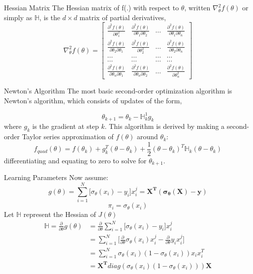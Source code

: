 \documentclass{beamer}
\begin{document}
\begin{frame}{Hessian Matrix}
The Hessian matrix of f(.) with respect to $\theta$, written $\nabla _{\theta}^{2}f(\theta)$ or simply as $\mathbb{H}$, is the $d \times d$ matrix of partial derivatives,
\begin{equation*}
\nabla _{\theta}^{2}f(\theta) = \begin{bmatrix} \frac{\partial^{2}f(\theta)}{\partial \theta_{1}^{2}} & \frac{\partial^{2}f(\theta)}{\partial \theta_{1}\partial \theta_{2}} & \ldots & \frac{\partial^{2}f(\theta)}{\partial \theta_{1}\partial \theta_{n}} \\ \frac{\partial^{2}f(\theta)}{\partial \theta_{2}\partial \theta_{1}} & \frac{\partial^{2}f(\theta)}{\partial \theta_{2}^{2}} & \ldots & \frac{\partial^{2}f(\theta)}{\partial \theta_{2}\partial \theta_{n}} \\ \ldots & \ldots & \ldots & \ldots \\ \ldots & \ldots & \ldots & \ldots \\ \frac{\partial^{2}f(\theta)}{\partial \theta_{n} \partial \theta_{1}} & \frac{\partial^{2}f(\theta)}{\partial \theta_{n}\partial \theta_{2}} & \ldots & \frac{\partial^{2}f(\theta)}{\partial \theta_{n}^{2}}\end{bmatrix}
\end{equation*}

\end{frame}
\begin{frame}{Newton's Algorithm}
The most basic second-order optimization algorithm is Newton's algorithm, which consists of updates of the form,

$$\theta_{k+1} = \theta_{k} - \mathbb{H}_{k}^{1}g_{k}$$
where $g_{k}$ is the gradient at step $k$. This algorithm is derived by making a second-order Taylor series approximation of $f(\theta)$ around $\theta_{k}$:
$$f_{quad}(\theta) = f(\theta_{k}) + g_{k}^{T}(\theta - \theta_{k}) + \frac{1}{2}(\theta - \theta_{k})^{T}\mathbb{H}_{k}(\theta - \theta_{k})$$
differentiating and equating to zero to solve for $\theta_{k+1}$.
\end{frame}
\begin{frame}{Learning Parameters}
Now assume:
$$g(\theta) = \sum_{i=1}^{N}\bigg[\sigma_{\theta}(x_{i}) - y_{i}\bigg]x_{i}^{j} = \mathbf{X^{T}(\sigma_{\theta}(X) - y)}$$
$$\pi_{i} = \sigma_{\theta}(x_{i})$$
Let $\mathbb{H}$ represent the Hessian of $J(\theta)$
\begin{align*}
\mathbb{H} = \frac{\partial}{\partial \theta} g(\theta) &= \frac{\partial}{\partial \theta} \sum_{i=1}^{N} \bigg[\sigma_{\theta}(x_{i}) - y_{i}\bigg]x_{i}^{j} \\
&= \sum_{i=1}^{N} \bigg[\frac{\partial}{\partial \theta}\sigma_{\theta}(x_{i})x_{i}^{j} - \frac{\partial}{\partial \theta} y_{i}x_{i}^{j}\bigg] \\
&= \sum_{i=1}^{N} \sigma_{\theta}(x_{i}) (1 - \sigma_{\theta}(x_{i}))x_{i}x_{i}^{T} \\
&= \mathbf{X^{T}}diag(\sigma_{\theta}(x_{i}) (1 - \sigma_{\theta}(x_{i})))\mathbf{X}
\end{align*}
\end{frame}
\end{document}
